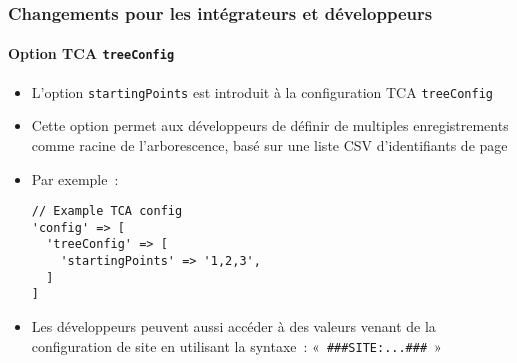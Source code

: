 %

\begin{frame}[fragile]
	\frametitle{Changements pour les intégrateurs et développeurs}
	\framesubtitle{Option TCA \texttt{treeConfig}}


	\begin{itemize}
		\item L'option \texttt{startingPoints} est introduit à la configuration TCA
			\texttt{treeConfig}
		\item Cette option permet aux développeurs de définir
			de multiples enregistrements comme racine de l'arborescence, basé sur une liste CSV d'identifiants de page
		\item Par exemple~:
\begin{lstlisting}
// Example TCA config
'config' => [
  'treeConfig' => [
    'startingPoints' => '1,2,3',
  ]
]
\end{lstlisting}
		\item Les développeurs peuvent aussi accéder à des valeurs venant de la configuration de site
		 	en utilisant la syntaxe~: \small«~\texttt{\#\#\#SITE:...\#\#\#}~»\normalsize
	\end{itemize}

\end{frame}

